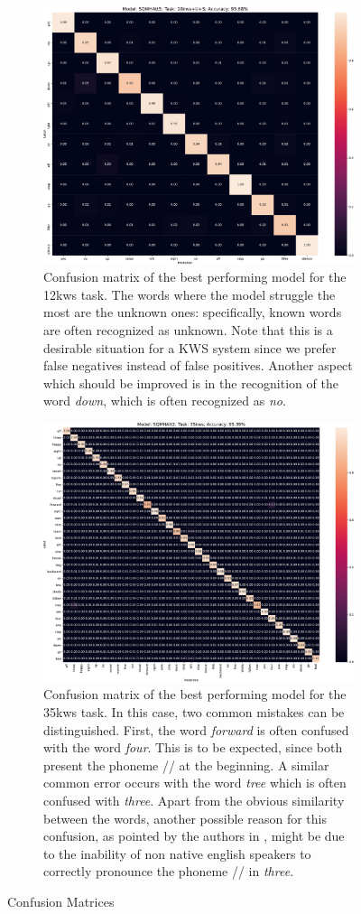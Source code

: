 \begin{figure}
	\centering
	\begin{subfigure}{\textwidth}
		\centering
		\includegraphics[width=0.6\linewidth]{imgs/SQMHAtt5_12kws.pdf}
		\caption{Confusion matrix of the best performing model for the 12kws task. The words where the model struggle the most are the unknown ones: specifically, known words are often recognized as unknown. Note that this is a desirable situation for a KWS system since we prefer false negatives instead of false positives. Another aspect which should be improved is in the recognition of the word \textit{down}, which is often recognized as \textit{no}.}
	\end{subfigure}
	\begin{subfigure}{\textwidth}
		\centering

	\includegraphics[width=0.65\linewidth]{imgs/SQMHAtt2_35kws.pdf}
			\caption{Confusion matrix of the best performing model for the 35kws task. In this case, two common mistakes can be distinguished. First, the word \textit{forward} is often confused with the word \textit{four}. This is to be expected, since both present the phoneme // at the beginning. A similar common error occurs with the word \textit{tree} which is often confused with \textit{three}. Apart from the obvious similarity between the words, another possible reason for this confusion, as pointed by the authors in \cite{attention2018andreade}, might be due to the inability of non native english speakers to correctly pronounce the phoneme  // in \textit{three}.}
	\end{subfigure}

\caption{Confusion Matrices}
\label{fig:confmatrices}
\end{figure}



